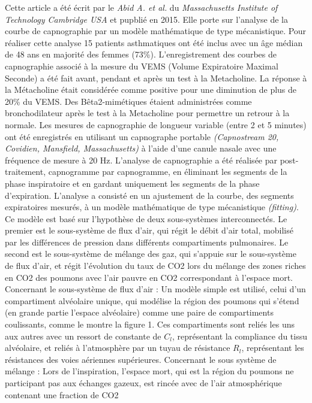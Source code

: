 \documentclass[12pt,]{article}
\begin{document}
Cette article a été écrit par le \emph{Abid A. et al.} du
\emph{Massachusetts Institute of Technology Cambridge USA} et pupblié en
2015. Elle porte sur l'analyse de la courbe de capnographie par un
modèle mathématique de type mécanistique. Pour réaliser cette analyse 15
patients asthmatiques ont été inclus avec un âge médian de 48 ans en
majorité des femmes (73\%). L'enregistrement des courbes de capnographie
associé à la mesure du VEMS (Volume Expiratoire Maximal Seconde) a été
fait avant, pendant et après un test à la Metacholine. La réponse à la
Métacholine était considérée comme positive pour une diminution de plus
de 20\% du VEMS. Des Bêta2-mimétiques étaient administrées comme
bronchodilateur après le test à la Metacholine pour permettre un retrour
à la normale. Les mesures de capnographie de longueur variable (entre 2
et 5 minutes) ont été enregistrés en utilisant un capnographe portable
\emph{(Capnostream 20, Covidien, Mansfield, Massachusetts)} à l'aide
d'une canule nasale avec une fréquence de mesure à 20 Hz. L'analyse de
capnographie a été réalisée par post-traitement, capnogramme par
capnogramme, en éliminant les segments de la phase inspiratoire et en
gardant uniquement les segments de la phase d'expiration. L'analyse a
consisté en un ajustement de la courbe, des segments expiratoires
mesurés, à un modèle mathématique de type mécanistique \emph{(fitting)}.
Ce modèle est basé sur l'hypothèse de deux sous-systèmes interconnectés.
Le premier est le sous-système de flux d'air, qui régit le débit d'air
total, mobilisé par les différences de pression dans différents
compartiments pulmonaires. Le second est le sous-système de mélange des
gaz, qui s'appuie sur le sous-système de flux d'air, et régit
l'évolution du taux de CO2 lors du mélange des zones riches en CO2 des
poumons avec l'air pauvre en CO2 correspondant à l'espace mort.
Concernant le sous-système de flux d'air : Un modèle simple est utilisé,
celui d'un compartiment alvéolaire unique, qui modélise la région des
poumons qui s'étend (en grande partie l'espace alvéolaire) comme une
paire de compartiments coulissants, comme le montre la figure 1. Ces
compartiments sont reliés les uns aux autres avec un ressort de
constante de \(C_{l}\), représentant la compliance du tissu alvéolaire,
et reliés à l'atmosphère par un tuyau de résistance \(R_{l}\),
représentant les résistances des voies aériennes supérieures. Concernant
le sous système de mélange : Lors de l'inspiration, l'espace mort, qui
est la région du poumons ne participant pas aux échanges gazeux, est
rincée avec de l'air atmosphérique contenant une fraction de CO2
\end{document}
